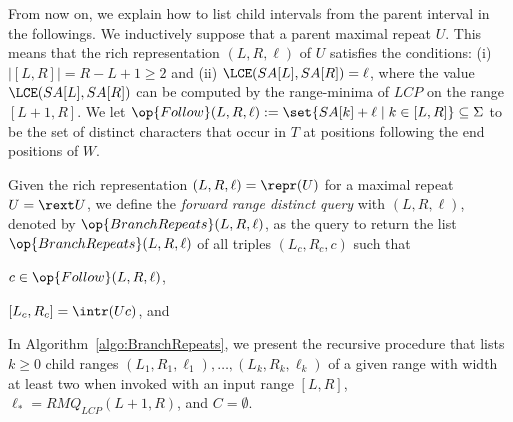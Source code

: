 
From now on, we explain how to list child intervals from the parent interval in the followings. 
We inductively suppose that a parent maximal repeat $U$. This means that the rich representation $(L,R,\ell)$ of $U$ satisfies the conditions: (i) $|[L,R]| = R - L + 1 \ge 2$ and (ii) $\LCE(SA[L], SA[R]) = \ell$, where the value $\LCE(SA[L], SA[R])$ can be computed by the range-minima of $LCP$ on the range $[L+1,R]$.
We let $\op{Follow}(L, R, \ell) := \set{SA[k]+\ell \mid k \in [L, R]} \subseteq \Sigma$ to be 
the set of distinct characters that occur in $T$ at positions following the end positions of $W$.

\begin{definition}
Given the rich representation $(L,R,\ell) = \repr(U)$ for a maximal repeat $U = \rext U$, we define the \textit{forward range distinct query} with $(L,R,\ell)$, denoted by $\op{BranchRepeats}(L, R, \ell)$, as the query to return the list $\op{BranchRepeats}(L, R, \ell)$ of all triples $(L_c, R_c, c)$ such that
\begin{enumerate*}[(i)]
\item $c \in \op{Follow}(L, R, \ell)$, 
\item $[L_c, R_c] = \intr(Uc)$, and 
\end{enumerate*}
\end{definition}

In Algorithm~\ref{algo:BranchRepeats}, we present the recursive procedure that lists $k\ge 0$ child ranges $(L_1, R_1, \ell_1), \dots, (L_k, R_k, \ell_k)$ of a given range with width at least two when invoked with an input range $[L, R]$, $\ell_* = RMQ_{LCP}(L+1, R)$, and $C = \emptyset$.

